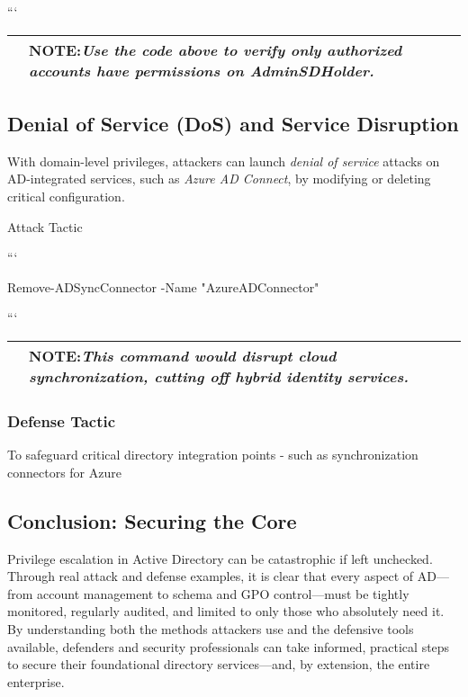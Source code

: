 ```

\begin{table}
\centering

\begin{tabular}{l l}
\hline
   & \textbf{NOTE:}\textit{Use the code above to verify only authorized accounts have permissions on AdminSDHolder.} \\
\hline

\end{tabular}

\end{table}

\subsection{Denial of Service (DoS) and Service Disruption}

With domain-level privileges, attackers can launch \textit{denial of service} attacks on AD-integrated services, such as \textit{Azure AD Connect}, by modifying or deleting critical configuration.

Attack Tactic

```

Remove-ADSyncConnector -Name "AzureADConnector"

```

\begin{table}
\centering

\begin{tabular}{l l}
\hline
   & \textbf{NOTE:}\textit{This command would disrupt cloud synchronization, cutting off hybrid identity services.} \\
\hline

\end{tabular}

\end{table}

\subsubsection{Defense Tactic}

To safeguard critical directory integration points - such as synchronization connectors for Azure

\subsection{Conclusion: Securing the Core}

Privilege escalation in Active Directory can be catastrophic if left unchecked. Through real attack and defense examples, it is clear that every aspect of AD—from account management to schema and GPO control—must be tightly monitored, regularly audited, and limited to only those who absolutely need it. By understanding both the methods attackers use and the defensive tools available, defenders and security professionals can take informed, practical steps to secure their foundational directory services—and, by extension, the entire enterprise.

 